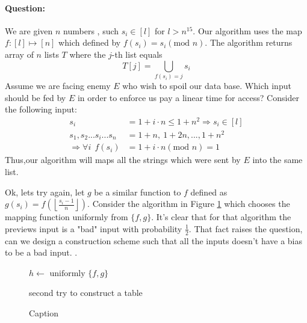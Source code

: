 \paragraph{Question:} We are given \(n\) numbers , such \( s_i \in \left[l\right]\) for \( l > n^{15} \). Our algorithm uses the map \(f : \left[l\right] \mapsto [n] \) which defined by \(f\left(s_{i}\right) = s_{i} \left(\text{mod } n\right)\).
The algorithm returns array of \(n\) lists \(T\) where the \(j\)-th list equals \begin{equation*}
T\left[j\right] = \bigcup_{f\left(s_i\right)=j}{s_i}\end{equation*} 
Assume we are facing enemy \( E \) who wish to spoil our data base. Which input should be fed by \(E\) in order to enforce us pay a linear time for access?
Consider the following input: \begin{equation*}
\begin{split}
    s_{i} &= 1 + i\cdot n \le 1 + n^2 \Rightarrow s_{i} \in \left[l\right] \\ 
    s_1,s_2 ... s_i ... s_n & = 1 + n, \ 1 + 2n, ..., 1 + n^2 \\ 
    \Rightarrow \forall i \ \  f\left(s_i\right) &  = 1 + i\cdot n    \left(\text{mod } n\right) = 1 
\end{split}
\end{equation*}
Thus,our algorithm will maps all the strings which were sent by \(E\) into the same list.

Ok, lets try again, let \(g\) be a similar function to \(f\) defined as \( g\left(s_{i}\right) =  f\left(\left\lfloor \frac{s_i - 1}{n} \right\rfloor \right)\).
Consider the algorithm in Figure \ref{fig:my_label} which chooses the mapping function uniformly from \(\{f,g\}\). It's clear that for that algorithm the previews input is a "bad" input with probability \(\frac{1}{2}\). 
That fact raises the question, can we design a construction scheme such that all the inputs doesn't have a bias to be a bad input. . 

\begin{figure}[h!]
    \centering
    \begin{algorithm}[H]
        \SetAlgoLined
         \(h \leftarrow \text{ uniformly } \{ f,g \} \)
         \ \\ 
         \caption{second try to construct a table}
    \end{algorithm}
    \caption{Caption}
    \label{fig:my_label}
\end{figure}

